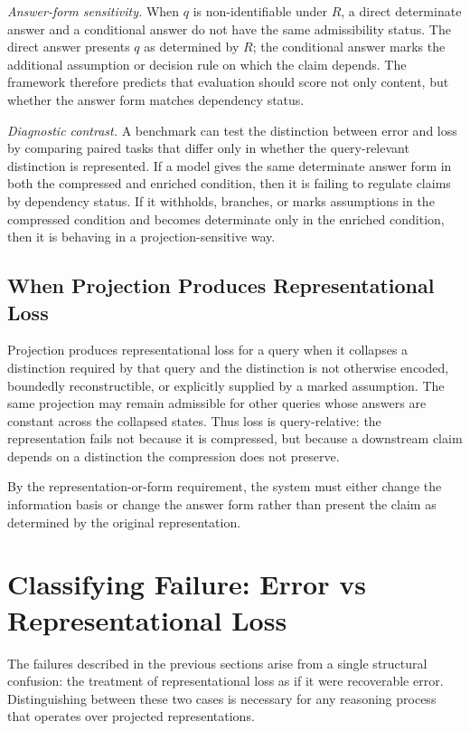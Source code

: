 \documentclass[11pt]{article}
\theoremstyle{definition}
\theoremstyle{remark}
\begin{document}
\emph{Answer-form sensitivity.}
When $q$ is non-identifiable under $R$, a direct determinate answer and a conditional answer do not have the same admissibility status. The direct answer presents $q$ as determined by $R$; the conditional answer marks the additional assumption or decision rule on which the claim depends. The framework therefore predicts that evaluation should score not only content, but whether the answer form matches dependency status.

\emph{Diagnostic contrast.}
A benchmark can test the distinction between error and loss by comparing paired tasks that differ only in whether the query-relevant distinction is represented. If a model gives the same determinate answer form in both the compressed and enriched condition, then it is failing to regulate claims by dependency status. If it withholds, branches, or marks assumptions in the compressed condition and becomes determinate only in the enriched condition, then it is behaving in a projection-sensitive way.

\subsection{When Projection Produces Representational Loss}

Projection produces representational loss for a query when it collapses a distinction required by that query and the distinction is not otherwise encoded, boundedly reconstructible, or explicitly supplied by a marked assumption. The same projection may remain admissible for other queries whose answers are constant across the collapsed states. Thus loss is query-relative: the representation fails not because it is compressed, but because a downstream claim depends on a distinction the compression does not preserve.

By the representation-or-form requirement, the system must either change the information basis or change the answer form rather than present the claim as determined by the original representation.

\section{Classifying Failure: Error vs Representational Loss}

The failures described in the previous sections arise from a single structural confusion: the treatment of representational loss as if it were recoverable error. Distinguishing between these two cases is necessary for any reasoning process that operates over projected representations.
\end{document}
